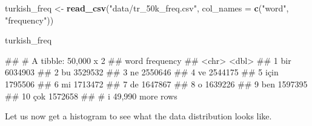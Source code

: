 \documentclass[
]{book}
\newenvironment{Shaded}{\begin{snugshade}}{\end{snugshade}}
\newcommand{\AttributeTok}[1]{\textcolor[rgb]{0.13,0.29,0.53}{#1}}
\newcommand{\DecValTok}[1]{\textcolor[rgb]{0.00,0.00,0.81}{#1}}
\newcommand{\FunctionTok}[1]{\textcolor[rgb]{0.13,0.29,0.53}{\textbf{#1}}}
\newcommand{\NormalTok}[1]{#1}
\newcommand{\OtherTok}[1]{\textcolor[rgb]{0.56,0.35,0.01}{#1}}
\newcommand{\SpecialCharTok}[1]{\textcolor[rgb]{0.81,0.36,0.00}{\textbf{#1}}}
\newcommand{\StringTok}[1]{\textcolor[rgb]{0.31,0.60,0.02}{#1}}
\begin{document}
\begin{Shaded}
\begin{Highlighting}[]
\NormalTok{turkish\_freq }\OtherTok{\textless{}{-}} \FunctionTok{read\_csv}\NormalTok{(}\StringTok{"data/tr\_50k\_freq.csv"}\NormalTok{, }\AttributeTok{col\_names =} \FunctionTok{c}\NormalTok{(}\StringTok{"word"}\NormalTok{, }\StringTok{"frequency"}\NormalTok{))}

\NormalTok{turkish\_freq}
\end{Highlighting}
\end{Shaded}

\begin{Shaded}
\begin{Highlighting}[]
\NormalTok{\#\# \# A tibble: 50,000 x 2}
\NormalTok{\#\#    word  frequency}
\NormalTok{\#\#    \textless{}chr\textgreater{}     \textless{}dbl\textgreater{}}
\NormalTok{\#\#  1 bir     6034903}
\NormalTok{\#\#  2 bu      3529532}
\NormalTok{\#\#  3 ne      2550646}
\NormalTok{\#\#  4 ve      2544175}
\NormalTok{\#\#  5 için    1795506}
\NormalTok{\#\#  6 mi      1713472}
\NormalTok{\#\#  7 de      1647867}
\NormalTok{\#\#  8 o       1639226}
\NormalTok{\#\#  9 ben     1597395}
\NormalTok{\#\# 10 çok     1572658}
\NormalTok{\#\# \# i 49,990 more rows}
\end{Highlighting}
\end{Shaded}

Let us now get a histogram to see what the data distribution looks like.

\begin{Shaded}
\end{Shaded}
\end{document}
